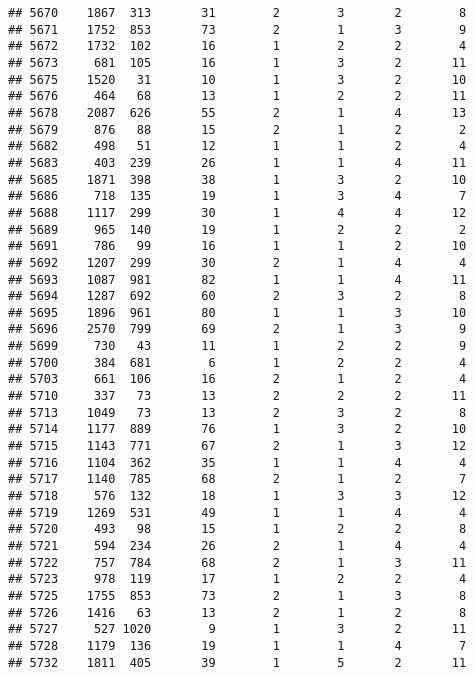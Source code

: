 \documentclass[]{article}
\begin{document}
\begin{verbatim}
## 5670    1867  313       31        2        3       2        8
## 5671    1752  853       73        2        1       3        9
## 5672    1732  102       16        1        2       2        4
## 5673     681  105       16        1        3       2       11
## 5675    1520   31       10        1        3       2       10
## 5676     464   68       13        1        2       2       11
## 5678    2087  626       55        2        1       4       13
## 5679     876   88       15        2        1       2        2
## 5682     498   51       12        1        1       2        4
## 5683     403  239       26        1        1       4       11
## 5685    1871  398       38        1        3       2       10
## 5686     718  135       19        1        3       4        7
## 5688    1117  299       30        1        4       4       12
## 5689     965  140       19        1        2       2        2
## 5691     786   99       16        1        1       2       10
## 5692    1207  299       30        2        1       4        4
## 5693    1087  981       82        1        1       4       11
## 5694    1287  692       60        2        3       2        8
## 5695    1896  961       80        1        1       3       10
## 5696    2570  799       69        2        1       3        9
## 5699     730   43       11        1        2       2        9
## 5700     384  681        6        1        2       2        4
## 5703     661  106       16        2        1       2        4
## 5710     337   73       13        2        2       2       11
## 5713    1049   73       13        2        3       2        8
## 5714    1177  889       76        1        3       2       10
## 5715    1143  771       67        2        1       3       12
## 5716    1104  362       35        1        1       4        4
## 5717    1140  785       68        2        1       2        7
## 5718     576  132       18        1        3       3       12
## 5719    1269  531       49        1        1       4        4
## 5720     493   98       15        1        2       2        8
## 5721     594  234       26        2        1       4        4
## 5722     757  784       68        2        1       3       11
## 5723     978  119       17        1        2       2        4
## 5725    1755  853       73        2        1       3        8
## 5726    1416   63       13        2        1       2        8
## 5727     527 1020        9        1        3       2       11
## 5728    1179  136       19        1        1       4        7
## 5732    1811  405       39        1        5       2       11

\end{verbatim}
\end{document}
